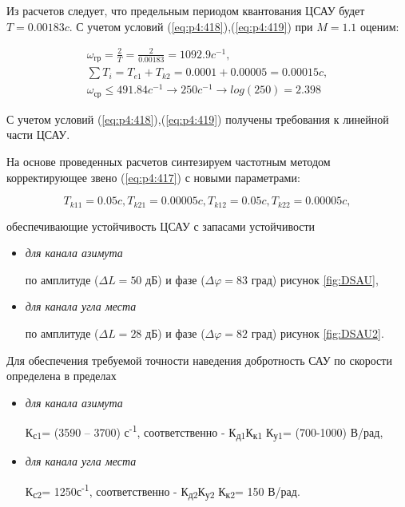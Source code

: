Из расчетов следует, что предельным периодом квантования ЦСАУ будет $T = 0.00183 c$. С учетом условий (\ref{eq:p4:418}),(\ref{eq:p4:419}) при $M=1.1$ оценим:\par

\begin{equation}
\label{eq:p4:x}
\begin{multlined}
\omega_{\textit{гр}}=\frac{2}{T}=\frac{2}{0.00183}=1092.9 c^{-1},\\ 
\sum T_{i}=T_{\textit{e1}}+T_{k2}=0.0001+0.00005=0.00015 c, \\
\omega _{\textit{ср}} \leq 491.84 c^{-1} \rightarrow 250 c^{-1} \rightarrow log(250) = 2.398
\end{multlined}
\end{equation}

С учетом условий (\ref{eq:p4:418}),(\ref{eq:p4:419}) получены требования к линейной части ЦСАУ.\par

На основе проведенных расчетов синтезируем частотным методом \cite{Bessekerski} корректирующее звено (\ref{eq:p4:417}) с новыми параметрами: \par

\begin{equation}
T_{k11} = 0.05 c, T_{k21} = 0.00005 c, T_{k12} = 0.05 c, T_{k22} = 0.00005 c, 
\end{equation}\par

обеспечивающие  устойчивость ЦСАУ с запасами устойчивости
\begin{itemize}
	\item \textit{для канала азимута}
	
	по амплитуде ($\varDelta L = 50$ дБ) и фазе  ($\varDelta \varphi = 83$ град) рисунок \ref{fig:DSAU},
	\item \textit{для канала угла места}
	
	по амплитуде ($\varDelta L = 28$ дБ) и фазе ($\varDelta \varphi = 82$ град)  рисунок \ref{fig:DSAU2}.
\end{itemize}

Для обеспечения требуемой точности наведения добротность САУ по скорости определена в пределах 
\begin{itemize}
	\item \textit{для канала азимута}
	
	К\textsubscript{с1}= (3590 – 3700) с\textsuperscript{-1}, соответственно - К\textsubscript{д1}К\textsubscript{к1 }К\textsubscript{у1}= (700-1000) В/рад,
	\item \textit{для канала угла места}
	
	К\textsubscript{с2}= 1250с\textsuperscript{-1}, соответственно - К\textsubscript{д2}К\textsubscript{у2} К\textsubscript{к2}= 150 В/рад.
\end{itemize}

